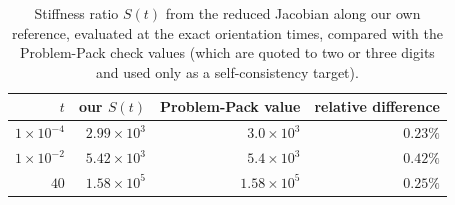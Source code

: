 \begin{table}[H]
\centering
\caption{Stiffness ratio $S(t)$ from the reduced Jacobian along our own reference, evaluated at the exact orientation times, compared with the Problem-Pack check values (which are quoted to two or three digits and used only as a self-consistency target).}
\label{tab:orientation}
\small
\begin{tabular}{rrrr}
\toprule
$t$ & our $S(t)$ & Problem-Pack value & relative difference\\
\midrule
$1\times10^{-4}$ & $2.99\times10^{3}$ & $3.0\times10^{3}$ & $0.23\%$\\
$1\times10^{-2}$ & $5.42\times10^{3}$ & $5.4\times10^{3}$ & $0.42\%$\\
$40$ & $1.58\times10^{5}$ & $1.58\times10^{5}$ & $0.25\%$\\
\bottomrule
\end{tabular}
\end{table}
